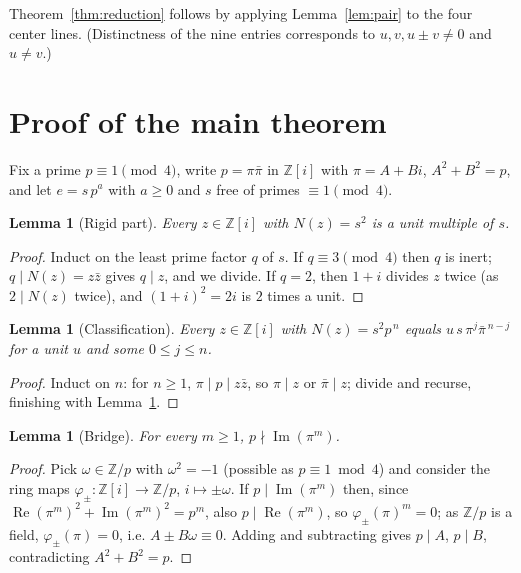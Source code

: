 \documentclass[11pt]{article}
\newtheorem{lemma}[theorem]{Lemma}
\theoremstyle{remark}
\newcommand{\Zi}{\mathbb{Z}[i]}
\newcommand{\Z}{\mathbb{Z}}
\DeclareMathOperator{\im}{Im}
\DeclareMathOperator{\re}{Re}
\begin{document}
Theorem~\ref{thm:reduction} follows by applying Lemma~\ref{lem:pair} to the
four center lines.  (Distinctness of the nine entries corresponds to
$u,v,u\pm v \neq 0$ and $u \neq v$.)

\section{Proof of the main theorem}

Fix a prime $p\equiv 1\pmod 4$, write $p=\pi\bar\pi$ in $\Zi$ with
$\pi = A + Bi$, $A^2+B^2=p$, and let $e = s\,p^a$ with $a\ge 0$ and $s$
free of primes $\equiv 1\pmod 4$.

\begin{lemma}[Rigid part]\label{lem:rigid}
Every $z\in\Zi$ with $N(z)=s^2$ is a unit multiple of $s$.
\end{lemma}

\begin{proof}
Induct on the least prime factor $q$ of $s$.  If $q\equiv 3\pmod 4$ then $q$
is inert; $q \mid N(z) = z\bar z$ gives $q\mid z$, and we divide.  If $q=2$,
then $1+i$ divides $z$ twice (as $2\mid N(z)$ twice), and
$(1+i)^2 = 2i$ is $2$ times a unit.
\end{proof}

\begin{lemma}[Classification]\label{lem:classify}
Every $z \in \Zi$ with $N(z) = s^2 p^{\,n}$ equals
$u\, s\, \pi^{j} \bar\pi^{\,n-j}$ for a unit $u$ and some $0\le j\le n$.
\end{lemma}

\begin{proof}
Induct on $n$: for $n\ge 1$, $\pi \mid p \mid z\bar z$, so $\pi\mid z$ or
$\bar\pi \mid z$; divide and recurse, finishing with Lemma~\ref{lem:rigid}.
\end{proof}

\begin{lemma}[Bridge]\label{lem:bridge}
For every $m\ge 1$, $p \nmid \im(\pi^m)$.
\end{lemma}

\begin{proof}
Pick $\omega \in \Z/p$ with $\omega^2=-1$ (possible as $p\equiv 1 \bmod 4$)
and consider the ring maps $\varphi_{\pm}:\Zi\to\Z/p$, $i\mapsto\pm\omega$.
If $p \mid \im(\pi^m)$ then, since
$\re(\pi^m)^2+\im(\pi^m)^2=p^m$, also $p\mid\re(\pi^m)$, so
$\varphi_\pm(\pi)^m=0$; as $\Z/p$ is a field, $\varphi_\pm(\pi)=0$, i.e.
$A\pm B\omega \equiv 0$.  Adding and subtracting gives $p\mid A$, $p \mid B$,
contradicting $A^2+B^2=p$.
\end{proof}
\end{document}
